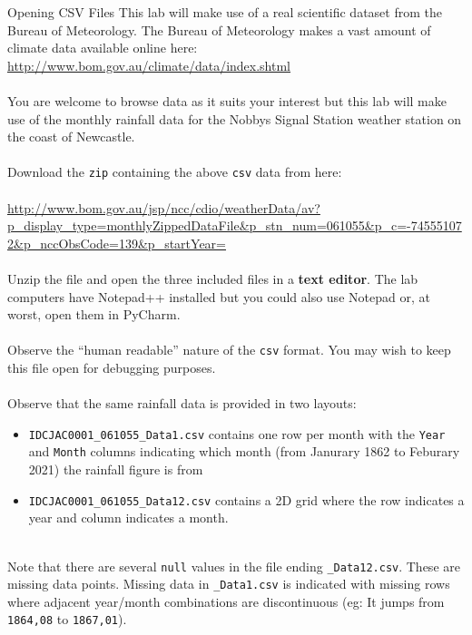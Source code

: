 \documentclass{lab}
\begin{document}
\begin{task}{Opening CSV Files}{}
This lab will make use of a real scientific dataset from the Bureau of Meteorology. The Bureau of Meteorology makes a vast amount of climate data available online here: \url{http://www.bom.gov.au/climate/data/index.shtml}
\\~\\
You are welcome to browse data as it suits your interest but this lab will make use of the monthly rainfall data for the Nobbys Signal Station weather station on the coast of Newcastle.
\\~\\
Download the \texttt{zip} containing the above \texttt{csv} data from here:\\~\\ \url{http://www.bom.gov.au/jsp/ncc/cdio/weatherData/av?p_display_type=monthlyZippedDataFile&p_stn_num=061055&p_c=-745551072&p_nccObsCode=139&p_startYear=}
\\~\\
Unzip the file and open the three included files in a \textbf{text editor}. The lab computers have Notepad++ installed but you could also use Notepad or, at worst, open them in PyCharm.
\\~\\
Observe the ``human readable'' nature of the \texttt{csv} format. You may wish to keep this file open for debugging purposes.
\\~\\
Observe that the same rainfall data is provided in two layouts:\\
\begin{itemize}
\item \texttt{IDCJAC0001\_061055\_Data1.csv} contains one row per month with the \texttt{Year} and \texttt{Month} columns indicating which month (from Janurary 1862 to Feburary 2021) the rainfall figure is from
\item \texttt{IDCJAC0001\_061055\_Data12.csv} contains a 2D grid where the row indicates a year and column indicates a month.
\end{itemize}
~\\
Note that there are several \texttt{null} values in the file ending \texttt{\_Data12.csv}. These are missing data points. Missing data in \texttt{\_Data1.csv} is indicated with missing rows where adjacent year/month combinations are discontinuous (eg: It jumps from \texttt{1864,08} to \texttt{1867,01}).
\end{task}
\end{document}
